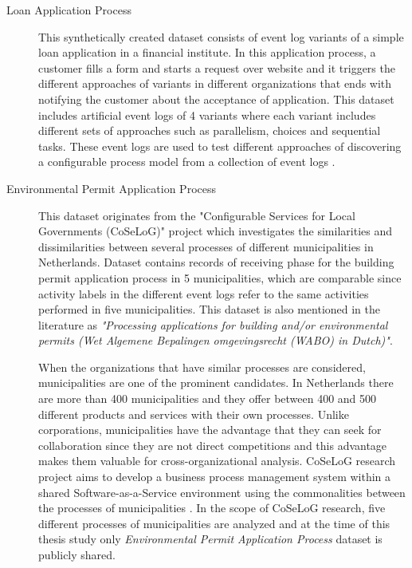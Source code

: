 \begin{description}
  \item[Loan Application Process \cite{loan-app-data}] This synthetically created dataset consists of event log variants of a simple loan application in a financial institute. In this application process, a customer fills a form and starts a request over website and it triggers the different approaches of variants in different organizations that ends with notifying the customer about the acceptance of application. This dataset includes artificial event logs of 4 variants where each variant includes different sets of approaches such as parallelism, choices and sequential tasks. These event logs are used to test different approaches of discovering a configurable process model from a collection of event logs \cite{buijs2014flexible}.
  \item[Environmental Permit Application Process \cite{coselog-data}] This dataset originates from the "Configurable Services for Local Governments (CoSeLoG)" project \cite{van2011business} which investigates the similarities and dissimilarities between several processes of different municipalities in Netherlands.  Dataset contains records of receiving phase for the building permit application process in 5 municipalities, which are comparable since activity labels in the different event logs refer to the same activities performed in five municipalities. This dataset is also mentioned in the literature as \textit{"Processing applications for building and/or environmental permits (Wet Algemene Bepalingen omgevingsrecht (WABO) in Dutch)"}.

  When the organizations that have similar processes are considered, municipalities are one of the prominent candidates. In Netherlands there are more than 400 municipalities and they offer between 400 and 500 different products and services with their own processes. Unlike corporations, municipalities have the advantage that they can seek for collaboration since they are not direct competitions \cite{buijs2012towards} and this advantage makes them valuable for cross-organizational analysis. CoSeLoG research project aims to develop a business process management system within a shared Software-as-a-Service environment using the commonalities between the processes of municipalities \cite{buijs2014flexible}. In the scope of CoSeLoG research, five different processes of municipalities are analyzed and at the time of this thesis study only \textit{Environmental Permit Application Process} dataset is publicly shared.
\end{description}

